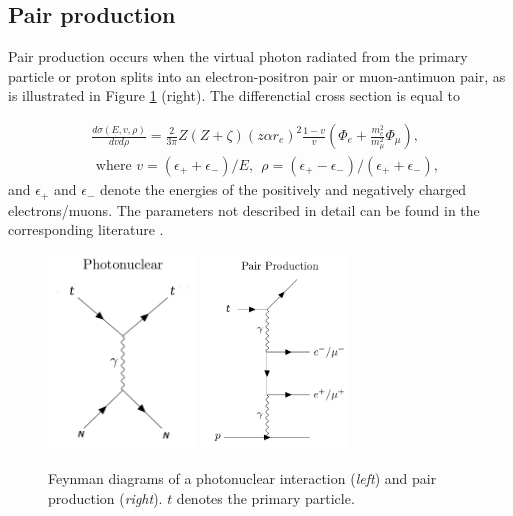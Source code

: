 \subsection{Pair production}
\label{subsec:pairprod}
Pair production occurs when the virtual photon radiated from the primary particle or proton splits into an electron-positron pair or muon-antimuon pair, as is illustrated in Figure \ref{fig:feynmannuclpairprod} (right). The differenctial cross section is equal to
 
\begin{equation}
\begin{split}
&\frac{d\sigma(E,v,\rho)}{dvd\rho} = \frac{2}{3\pi} Z(Z+\zeta)(z \alpha r_e)^2 \frac{1-v}{v} \left(\Phi_e + \frac{m_e^2}{m_\mu^2} \Phi_\mu \right), \\
& \textrm{ where \ \ } v = (\epsilon_+ + \epsilon_-)/E, \ \ \rho = (\epsilon_+ - \epsilon_-)/(\epsilon_+ + \epsilon_-),
\end{split}
\end{equation}
and $\epsilon_+$ and $\epsilon_-$ denote the energies of the positively and negatively charged electrons/muons. The parameters not described in detail can be found in the corresponding literature \cite{Chirkin:2004hz}.

\begin{figure}
\centering
\includegraphics[width = 0.35\textwidth]{chapter4/img/Feynman_PhotoNuclear_2.png}
\includegraphics[width = 0.35\textwidth]{chapter4/img/Feynman_PairProduction_2.png}
\caption{Feynman diagrams of a photonuclear interaction (\textit{left}) and pair production (\textit{right}). $t$ denotes the primary particle.}
\label{fig:feynmannuclpairprod}
\end{figure}

